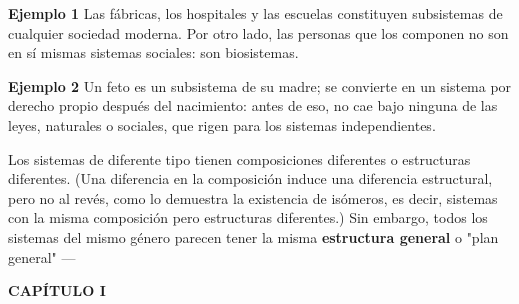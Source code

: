 {\textbf{Ejemplo 1} Las fábricas, los hospitales y las escuelas constituyen subsistemas de cualquier sociedad moderna. Por otro lado, las personas que los componen no son en sí mismas sistemas sociales: son biosistemas.

\textbf{Ejemplo 2} Un feto es un subsistema de su madre; se convierte en un sistema por derecho propio después del nacimiento: antes de eso, no cae bajo ninguna de las leyes, naturales o sociales, que rigen para los sistemas independientes.

Los sistemas de diferente tipo tienen composiciones diferentes o estructuras diferentes. (Una diferencia en la composición induce una diferencia estructural, pero no al revés, como lo demuestra la existencia de isómeros, es decir, sistemas con la misma composición pero estructuras diferentes.) Sin embargo, todos los sistemas del mismo género parecen tener la misma \textbf{estructura general} o "plan general" —
}
\newpage
\fancyhf{}
\fancyhead[l]{\thepage} 
\begin{center}
{\fontsize{16}{18}\selectfont \textbf{CAPÍTULO I}}
\end{center}
\vspace{0.5cm}

